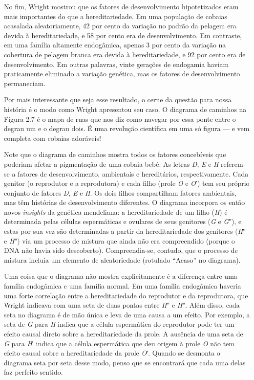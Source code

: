 \documentclass[11pt,a5paper,twoside]{book}
\begin{document}
No fim, Wright mostrou que os fatores de desenvolvimento hipotetizados eram mais importantes do que a hereditariedade. Em uma população de cobaias acasalada aleatoriamente, 42 por cento da variação no padrão da pelagem era devida à hereditariedade, e 58 por cento era de desenvolvimento. Em contraste, em uma família altamente endogâmica, apenas 3 por cento da variação na cobertura de pelagem branca era devida à hereditariedade, e 92 por cento era de desenvolvimento. Em outras palavras, vinte gerações de endogamia haviam praticamente eliminado a variação genética, mas os fatores de desenvolvimento permaneciam.

Por mais interessante que seja esse resultado, o cerne da questão para nossa história é o modo como Wright apresentou seu caso. O diagrama de caminhos na Figura 2.7 é o mapa de ruas que nos diz como navegar por essa ponte entre o degrau um e o degrau dois. É uma revolução científica em uma só figura — e vem completa com cobaias adoráveis!

Note que o diagrama de caminhos mostra todos os fatores concebíveis que poderiam afetar a pigmentação de uma cobaia bebê. As letras \textit{D}, \textit{E} e \textit{H} referem-se a fatores de desenvolvimento, ambientais e hereditários, respectivamente. Cada genitor (o reprodutor e a reprodutora) e cada filho (prole \textit{O} e \textit{O}′) tem seu próprio conjunto de fatores \textit{D}, \textit{E} e \textit{H}. Os dois filhos compartilham fatores ambientais, mas têm histórias de desenvolvimento diferentes. O diagrama incorpora os então novos \textit{insights} da genética mendeliana: a hereditariedade de um filho (\textit{H}) é determinada pelas células espermáticas e ovulares de seus genitores (\textit{G} e \textit{G}″), e estas por sua vez são determinadas a partir da hereditariedade dos genitores (\textit{H}″ e \textit{H}‴) via um processo de mistura que ainda não era compreendido (porque o DNA não havia sido descoberto). Compreendia-se, contudo, que o processo de mistura incluía um elemento de aleatoriedade (rotulado “Acaso” no diagrama).

Uma coisa que o diagrama não mostra explicitamente é a diferença entre uma família endogâmica e uma família normal. Em uma família endogâmica haveria uma forte correlação entre a hereditariedade do reprodutor e da reprodutora, que Wright indicava com uma seta de duas pontas entre \textit{H}″ e \textit{H}‴. Além disso, cada seta no diagrama é de mão única e leva de uma causa a um efeito. Por exemplo, a seta de \textit{G} para \textit{H} indica que a célula espermática do reprodutor pode ter um efeito causal direto sobre a hereditariedade da prole. A ausência de uma seta de \textit{G} para \textit{H}′ indica que a célula espermática que deu origem à prole \textit{O} não tem efeito causal sobre a hereditariedade da prole \textit{O}′. Quando se desmonta o diagrama seta por seta desse modo, penso que se encontrará que cada uma delas faz perfeito sentido.
\end{document}
